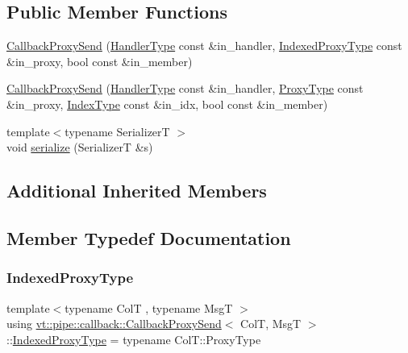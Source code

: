 \subsection*{Public Member Functions}
\begin{DoxyCompactItemize}
\item 
\hyperlink{structvt_1_1pipe_1_1callback_1_1_callback_proxy_send_afe833dd6bf8a9aef9bbd9be0f5e00c7c}{Callback\+Proxy\+Send} (\hyperlink{namespacevt_af64846b57dfcaf104da3ef6967917573}{Handler\+Type} const \&in\+\_\+handler, \hyperlink{structvt_1_1pipe_1_1callback_1_1_callback_proxy_send_a993aff1afaaf07a0d2c60a4ca96426f8}{Indexed\+Proxy\+Type} const \&in\+\_\+proxy, bool const \&in\+\_\+member)
\item 
\hyperlink{structvt_1_1pipe_1_1callback_1_1_callback_proxy_send_a053e9ba748e53084c8f58c2d1a11773b}{Callback\+Proxy\+Send} (\hyperlink{namespacevt_af64846b57dfcaf104da3ef6967917573}{Handler\+Type} const \&in\+\_\+handler, \hyperlink{structvt_1_1pipe_1_1callback_1_1_callback_proxy_send_a2aece7c6f8bd17a4c0b1fdca75d84579}{Proxy\+Type} const \&in\+\_\+proxy, \hyperlink{structvt_1_1pipe_1_1callback_1_1_callback_proxy_send_adf233dca6b029304153ba59fecf6113f}{Index\+Type} const \&in\+\_\+idx, bool const \&in\+\_\+member)
\item 
{\footnotesize template$<$typename SerializerT $>$ }\\void \hyperlink{structvt_1_1pipe_1_1callback_1_1_callback_proxy_send_a3f19aedbb799628c77163b440d3b6d03}{serialize} (SerializerT \&s)
\end{DoxyCompactItemize}
\subsection*{Additional Inherited Members}


\subsection{Member Typedef Documentation}
\mbox{\label{structvt_1_1pipe_1_1callback_1_1_callback_proxy_send_a993aff1afaaf07a0d2c60a4ca96426f8}} 
\subsubsection{\texorpdfstring{Indexed\+Proxy\+Type}{IndexedProxyType}}
{\footnotesize\ttfamily template$<$typename ColT , typename MsgT $>$ \\
using \hyperlink{structvt_1_1pipe_1_1callback_1_1_callback_proxy_send}{vt\+::pipe\+::callback\+::\+Callback\+Proxy\+Send}$<$ ColT, MsgT $>$\+::\hyperlink{structvt_1_1pipe_1_1callback_1_1_callback_proxy_send_a993aff1afaaf07a0d2c60a4ca96426f8}{Indexed\+Proxy\+Type} =  typename Col\+T\+::\+Proxy\+Type}

